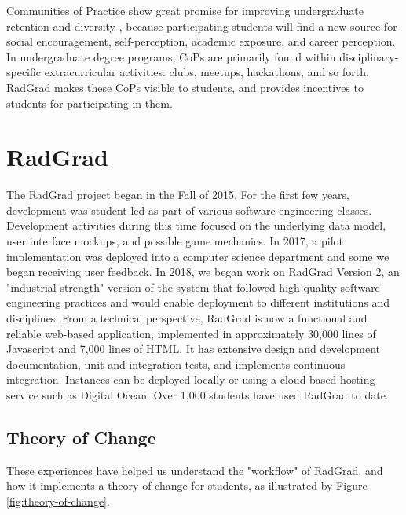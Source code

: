 \documentclass[acmsmall]{acmart}
\begin{document}
Communities of Practice show great promise for improving undergraduate retention \cite{barker_results_2014} and diversity \cite{gardner_authentic_2015}, because participating students will find a new source for social encouragement, self-perception, academic exposure, and career perception. In undergraduate degree programs, CoPs are primarily found within disciplinary-specific extracurricular activities: clubs, meetups, hackathons, and so forth. RadGrad makes these CoPs visible to students, and provides incentives to students for participating in them.

\section{RadGrad}
\label{sec:radgrad}

The RadGrad project began in the Fall of 2015. For the first few years, development was student-led as part of various software engineering classes. Development activities during this time focused on the underlying data model, user interface mockups, and possible game mechanics. In 2017, a pilot implementation was deployed into a computer science department and some we began receiving user feedback. In 2018, we began work on RadGrad Version 2, an "industrial strength" version of the system that followed high quality software engineering practices and would enable deployment to different institutions and disciplines. From a technical perspective, RadGrad is now a functional and reliable web-based application, implemented in approximately 30,000 lines of Javascript and 7,000 lines of HTML. It has extensive design and development documentation, unit and integration tests, and implements continuous integration. Instances can be deployed locally or using a cloud-based hosting service such as Digital Ocean. Over 1,000 students have used RadGrad to date.

\subsection{Theory of Change}

These experiences have helped us understand the "workflow" of RadGrad, and how it implements a theory of change for students, as illustrated by Figure \ref{fig:theory-of-change}.
\end{document}
